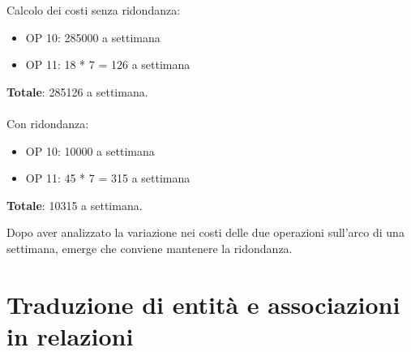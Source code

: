 \documentclass[a4paper,12pt]{report}
\begin{document}
\pagebreak

Calcolo dei costi senza ridondanza:

\begin{itemize}
    \item OP 10: 285000 a settimana
    \item OP 11: 18 * 7 = 126 a settimana
\end{itemize}

\textbf{Totale}: 285126 a settimana. \\ \\
Con ridondanza:

\begin{itemize}
    \item OP 10: 10000 a settimana
    \item OP 11: 45 * 7 = 315 a settimana
\end{itemize}

\textbf{Totale}: 10315 a settimana. \par
Dopo aver analizzato la variazione nei costi delle due operazioni sull'arco di una settimana, emerge che conviene mantenere la ridondanza.  

\section{Traduzione di entità e associazioni in relazioni}
\end{document}
